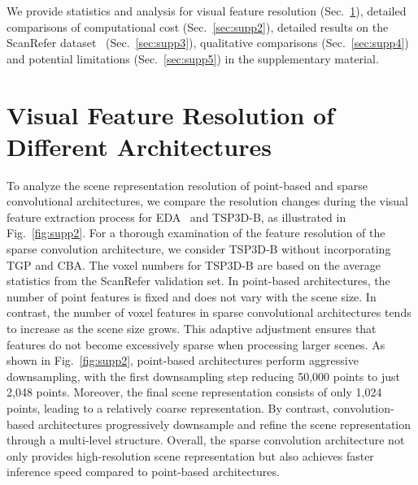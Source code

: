 \clearpage
\setcounter{page}{1}
\appendix
\maketitlesupplementary

We provide statistics and analysis for visual feature resolution (Sec.~\ref{sec:supp1}), detailed comparisons of computational cost (Sec.~\ref{sec:supp2}), detailed results on the ScanRefer dataset~\citep{chen2020scanrefer} (Sec.~\ref{sec:supp3}), qualitative comparisons (Sec.~\ref{sec:supp4}) and potential limitations (Sec.~\ref{sec:supp5}) in the supplementary material.


\section{Visual Feature Resolution of Different Architectures}\label{sec:supp1}
To analyze the scene representation resolution of point-based and sparse convolutional architectures, we compare the resolution changes during the visual feature extraction process for EDA~\citep{wu2023eda} and TSP3D-B, as illustrated in Fig.~\ref{fig:supp2}. For a thorough examination of the feature resolution of the sparse convolution architecture, we consider TSP3D-B without incorporating TGP and CBA.
The voxel numbers for TSP3D-B are based on the average statistics from the ScanRefer validation set. In point-based architectures, the number of point features is fixed and does not vary with the scene size. In contrast, the number of voxel features in sparse convolutional architectures tends to increase as the scene size grows. This adaptive adjustment ensures that features do not become excessively sparse when processing larger scenes. 
As shown in Fig.~\ref{fig:supp2}, point-based architectures perform aggressive downsampling, with the first downsampling step reducing 50,000 points to just 2,048 points. Moreover, the final scene representation consists of only 1,024 points, leading to a relatively coarse representation. By contrast, convolution-based architectures progressively downsample and refine the scene representation through a multi-level structure. Overall, the sparse convolution architecture not only provides high-resolution scene representation but also achieves faster inference speed compared to point-based architectures.

